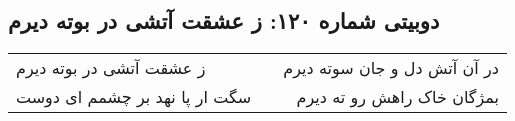 \begin{center}
\section*{دوبیتی شماره ۱۲۰: ز عشقت آتشی در بوته دیرم}
\label{sec:120}
\begin{longtable}{l p{0.5cm} r}
ز عشقت آتشی در بوته دیرم
&&
در آن آتش دل و جان سوته دیرم
\\
سگت ار پا نهد بر چشمم ای دوست
&&
بمژگان خاک راهش رو ته دیرم
\\
\end{longtable}
\end{center}
